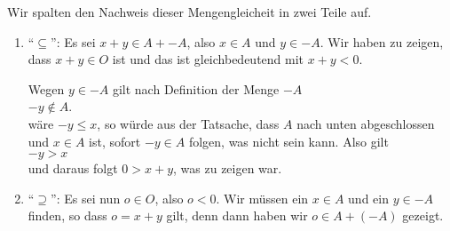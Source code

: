 \proof
  Wir spalten den Nachweis dieser Mengengleicheit in zwei Teile auf.
\begin{enumerate}
\item ``$\subseteq$'':  Es sei $x + y \in A + -\!A$, also $x \in A$ und $y \in -A$.
      Wir haben zu zeigen, dass $x + y \in O$ ist und das ist gleichbedeutend mit $x + y < 0$.

      Wegen $y \in -\!A$ gilt nach Definition der Menge $-\!A$
      \\[0.2cm]
      \hspace*{1.3cm}
      $-y \not \in A$.
      \\[0.2cm]
      w\"are $-y \leq x$, so w\"urde aus der Tatsache, dass $A$ nach unten abgeschlossen und $x \in A$
      ist, sofort $-y \in A$ folgen, was nicht sein kann.  Also gilt
      \\[0.2cm]
      \hspace*{1.3cm}
      $-y > x$
      \\[0.2cm]
      und daraus folgt $0 > x + y$, was zu zeigen war.
\item ``$\supseteq$'': Es sei nun $o \in O$, also $o < 0$.  Wir m\"ussen ein $x \in A$ und ein $y \in -A$
      finden, so dass $o = x + y$ gilt, denn dann haben wir $o \in A + (-A)$ gezeigt.


\end{enumerate}
